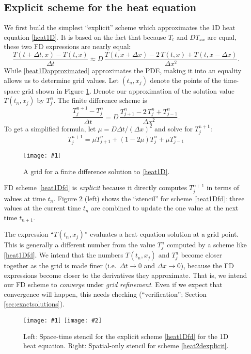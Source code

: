 \documentclass[letterpaper,final,12pt,reqno]{amsart}
\newcommand{\onefigsize}[3]{
\begin{figure}[ht]
\centering
\texttt{[image: \#1]}
\caption{#2}
\label{fig:#1}
\end{figure}}
\newcommand{\twofigsizes}[5]{
\begin{figure}[ht]
\centering
\texttt{[image: \#1]} \quad
\texttt{[image: \#2]}
\caption{#3}
\label{fig:#1}
\end{figure}}
\begin{document}
\subsection*{Explicit scheme for the heat equation}  We first build the simplest ``explicit'' scheme which approximates the 1D heat equation \eqref{heat1D}.  It is based on the fact that because $T_t$ and $D T_{xx}$ are equal, these two FD expressions are nearly equal:
\begin{equation}
\frac{T(t+\Delta t,x) - T(t,x)}{\Delta t} \approx D\,\frac{T(t,x+\Delta x) - 2\, T(t,x) + T(t,x-\Delta x)}{\Delta x^2}.  \label{heat1Dapproximated}
\end{equation}
While \eqref{heat1Dapproximated} approximates the PDE, making it into an equality allows us to determine grid values.  Let $(t_n,x_j)$ denote the points of the time-space grid shown in Figure \ref{fig:timespacegrid}.  Denote our approximation of the solution value $T(t_n,x_j)$ by $T_j^n$.  The finite difference scheme is
	$$\frac{T_j^{n+1} - T_j^n}{\Delta t} = D\,\frac{T_{j+1}^n - 2\, T_j^n + T_{j-1}^n}{\Delta x^2}.$$
To get a simplified formula, let $\mu = D \Delta t / (\Delta x)^2$ and solve for $T_j^{n+1}$:
\begin{equation}
  T_j^{n+1} = \mu T_{j+1}^n + (1 - 2 \mu) T_j^n + \mu T_{j-1}^n \label{heat1Dfd}
\end{equation}

\onefigsize{timespacegrid}{A grid for a finite difference solution to \eqref{heat1D}.}{2.0in}

FD scheme \eqref{heat1Dfd} is \emph{explicit} because it directly computes $T_j^{n+1}$ in terms of values at time $t_n$.  Figure \ref{fig:expstencil} (left) shows the ``stencil'' for scheme \eqref{heat1Dfd}: three values at the current time $t_n$ are combined to update the one value at the next time $t_{n+1}$.

The expression ``$T(t_n,x_j)$'' evaluates a heat equation solution at a grid point.  This is generally a different number from the value $T_j^n$ computed by a scheme like \eqref{heat1Dfd}.  We intend that the numbers $T(t_n,x_j)$ and $T_j^n$ become closer together as the grid is made finer (i.e.~$\Delta t \to 0$ and $\Delta x \to 0$), because the FD expressions become closer to the derivatives they approximate.  That is, we intend our FD scheme to \emph{converge} under \emph{grid refinement}.  Even if we expect that convergence will happen, this needs checking (``verification''; Section \ref{sec:exactsolutions}).

\twofigsizes{expstencil}{exp2dstencil}{Left: Space-time stencil for the explicit scheme \eqref{heat1Dfd} for the 1D heat equation.  Right: Spatial-only stencil for scheme \eqref{heat2dexplicit}.}{2.0in}{2.1in}
\end{document}
